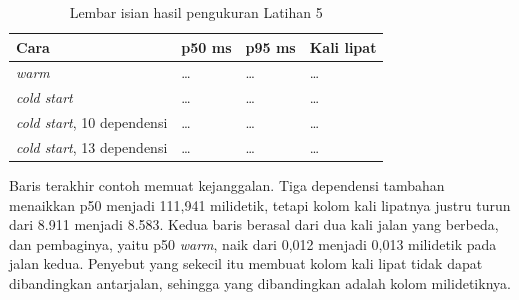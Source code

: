 \begin{table}[!htb]
  \centering
  \caption{Lembar isian hasil pengukuran Latihan 5}
  \label{tab:c14-lat5-hasil}
  \begin{tabularx}{\textwidth}{Xlll}
    \hline
    \textbf{Cara} & \textbf{p50 ms} & \textbf{p95 ms} & \textbf{Kali lipat} \\
    \hline
    \textit{warm} & \dots & \dots & \dots \\
    \hline
    \textit{cold start} & \dots & \dots & \dots \\
    \hline
    \textit{cold start}, 10 dependensi & \dots & \dots & \dots \\
    \hline
    \textit{cold start}, 13 dependensi & \dots & \dots & \dots \\
    \hline
  \end{tabularx}
\end{table}

Baris terakhir contoh memuat kejanggalan. Tiga dependensi tambahan menaikkan
p50 menjadi 111,941 milidetik, tetapi kolom kali lipatnya justru turun dari
8.911 menjadi 8.583. Kedua baris berasal dari dua kali jalan yang berbeda,
dan pembaginya, yaitu p50 \textit{warm}, naik dari 0,012 menjadi 0,013
milidetik pada jalan kedua. Penyebut yang sekecil itu membuat kolom kali
lipat tidak dapat dibandingkan antarjalan, sehingga yang dibandingkan adalah
kolom milidetiknya.
